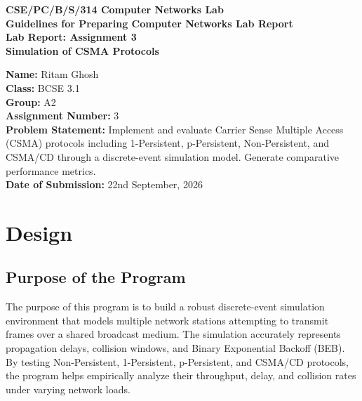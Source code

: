 \documentclass[a4paper,12pt]{article}
\begin{document}
\begin{titlepage}
    \centering
    \vspace*{1in}
    
    {\Large \textbf{CSE/PC/B/S/314 Computer Networks Lab}}\\[0.5cm]
    {\large \textbf{Guidelines for Preparing Computer Networks Lab Report}}\\[2cm]
    
    {\Huge \textbf{Lab Report: Assignment 3}}\\[0.5cm]
    {\LARGE \textbf{Simulation of CSMA Protocols}}\\[2cm]
    
    \begin{flushleft}
        \textbf{Name:} Ritam Ghosh \\
        \textbf{Class:} BCSE 3.1 \\
        \textbf{Group:} A2 \\
        \textbf{Assignment Number:} 3 \\
        \textbf{Problem Statement:} Implement and evaluate Carrier Sense Multiple Access (CSMA) protocols including 1-Persistent, p-Persistent, Non-Persistent, and CSMA/CD through a discrete-event simulation model. Generate comparative performance metrics. \\
        \textbf{Date of Submission:} 22nd September, 2026 \\
    \end{flushleft}
    
    \vfill
\end{titlepage}

\tableofcontents
\newpage

\section{Design}

\subsection{Purpose of the Program}
The purpose of this program is to build a robust discrete-event simulation environment that models multiple network stations attempting to transmit frames over a shared broadcast medium. The simulation accurately represents propagation delays, collision windows, and Binary Exponential Backoff (BEB). By testing Non-Persistent, 1-Persistent, p-Persistent, and CSMA/CD protocols, the program helps empirically analyze their throughput, delay, and collision rates under varying network loads.
\end{document}
